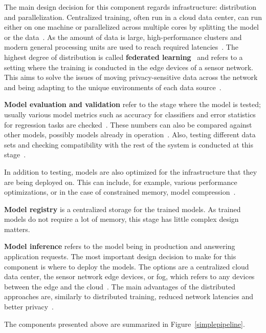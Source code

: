 The main design decision for this component regards infrastructure: distribution and parallelization. Centralized training, often run in a cloud data center, can run either on one machine or parallelized across multiple cores by splitting the model or the data~\cite{ben-nunDemystifyingParallelDistributed2019}. As the amount of data is large, high-performance clusters and modern general processing units are used to reach required latencies~\cite{iotsurvey}. The highest degree of distribution is called \textbf{federated learning}~\cite{iotsurvey} and refers to a setting where the training is conducted in the edge devices of a sensor network. This aims to solve the issues of moving privacy-sensitive data across the network and being adapting to the unique environments of each data source~\cite{iotsurvey}.

\textbf{Model evaluation and validation} refer to the stage where the model is tested; usually various model metrics such as accuracy for classifiers and error statistics for regression tasks are checked~\cite{iotsurvey}. These numbers can also be compared against other models, possibly models already in operation~\cite{googlemlops}. Also, testing different data sets and checking compatibility with the rest of the system is conducted at this stage~\cite{googlemlops}.
\enlargethispage{7mm}

In addition to testing, models are also optimized for the infrastructure that they are being deployed on. This can include, for example, various performance optimizations, or in the case of constrained memory, model compression~\cite{iotsurvey}.

\textbf{Model registry} is a centralized storage for the trained models. As trained models do not require a lot of memory, this stage has little complex design matters.

\textbf{Model inference} refers to the model being in production and answering application requests.
The most important design decision to make for this component is where to deploy the models. The options are a centralized cloud data center, the sensor network edge devices, or fog, which refers to any devices between the edge and the cloud~\cite{fogsurvey}. The main advantages of the distributed approaches are, similarly to distributed training, reduced network latencies and better privacy~\cite{szeEfficientProcessingDeep2017}.

The components presented above are summarized in Figure~\ref{simplepipeline}.

